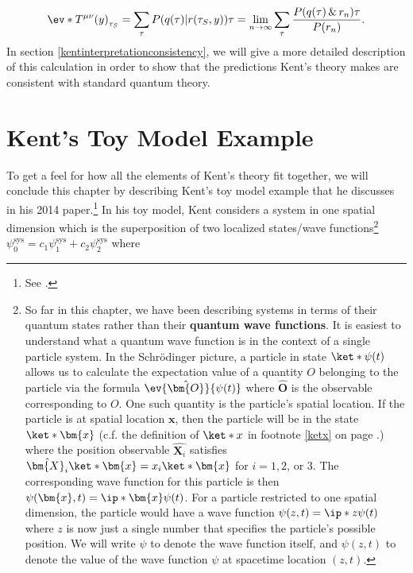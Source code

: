 \documentclass[12pt]{report}
\begin{document}
\begin{equation}\label{beable1}
  \ev*{T^{\mu\nu}(y)}_{\tau_S}=\sum_\tau P(q(\tau) | r(\tau_S,y))\tau=\lim_{n\rightarrow\infty}\sum_\tau\frac{P(q(\tau) \, \& \, r_n)\tau}{P(r_n)}.
  \end{equation} 
In section \ref{kentinterpretationconsistency}, we will give a more detailed description of this calculation in order to show that the predictions Kent's theory makes are consistent with standard quantum theory.




\section{Kent's Toy Model Example}\label{toysection}
To get a feel for how all the elements of Kent's theory fit together, we will conclude this chapter by describing Kent's toy model example that he discusses in his 2014 paper.\footnote{See \cite[p. 3--4]{Kent2014}.} In his toy model, Kent considers a system in one spatial dimension which is the superposition of two localized states/wave functions\footnote{So far in this chapter, we have been describing systems in terms of their quantum states rather than their \textbf{quantum wave functions}.\label{wavefunctionfootnote} It is easiest to understand what a quantum wave function is in the context of a single particle system. In the Schr\"{o}dinger picture, a particle in state $\ket*{\psi(t)}$ allows us to calculate the expectation value of a quantity $O$ belonging to the particle via the formula $\ev{\hat{\bm{O}}}{\psi(t)}$ where $\hat{\bm{O}}$ is the observable corresponding to $O$. One such quantity is the particle's spatial location. If the particle is at spatial location $\bm{x}$, then the particle will be in the state $\ket*{\bm{x}}$ (c.f. the definition of $\ket*{x}$ in footnote \ref{ketx} on page \pageref{ketx}.) where the position observable $\hat{\bm{X}_i}$ satisfies $\hat{\bm{X}_i}\ket*{\bm{x}}=x_i\ket*{\bm{x}}$ for $i=1,2$, or $3$. The corresponding wave function for this particle is then   $\psi(\bm{x}, t)=\ip*{\bm{x}}{\psi(t)}$. For a particle restricted to one spatial dimension, the particle would have a wave function $\psi(z, t)=\ip*{z}{\psi(t)}$ where $z$ is now just a single number that specifies the particle's possible position. We will write $\psi$ to denote the wave function itself, and $\psi(z,t)$ to denote the value of the wave function $\psi$ at spacetime location $(z,t)$.}  $\psi_0^\text{sys}=c_1 \psi_1^\text{sys}+c_2\psi_2^\text{sys}$ where %
\end{document}
